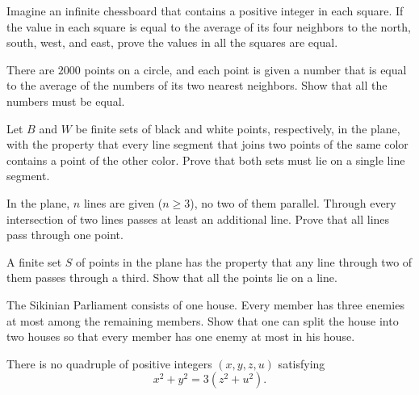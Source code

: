 \documentclass[12pt]{article}
\begin{document}
        \begin{exercise}
            Imagine an infinite chessboard that contains a positive integer in each square. If the value in each square is equal to the average of its four neighbors to the north, south, west, and east, prove the values in all the squares are equal. 
        \end{exercise}
        
        \begin{exercise}
            There are $2000$ points on a circle, and each point is given a number that is equal to the average of the numbers of its two nearest neighbors. Show that all the numbers must be equal.
        \end{exercise}
        
        \begin{exercise}
           Let $B$ and $W$ be finite sets of black and white points, respectively, in the plane, with the property that every line segment that joins two points of the same color contains a point of the other color. Prove that both sets must lie on a single line segment.
        \end{exercise}
        
        \begin{exercise}
            In the plane, $n$ lines are given ($n \geq 3$), no two of them parallel. Through every intersection of two lines passes at least an additional line. Prove that all lines pass through one point. 
        \end{exercise}
        
        
        \begin{exercise}
            A finite set $S$ of points in the plane has the property that any line through two of them passes through a third. Show that all the points lie on a line. 
        \end{exercise}
        
        \begin{exercise}
            The Sikinian Parliament consists of one house. Every member has three enemies at most among the remaining members. Show that one can split the house into two houses so that every member has one enemy at most in his house. 
        \end{exercise}

        \begin{exercise}
            There is no quadruple of positive integers $(x, y, z, u)$ satisfying 
            \[x^2 + y^2 = 3(z^{2} + u^{2}).\]
        \end{exercise}
        
\end{document}
